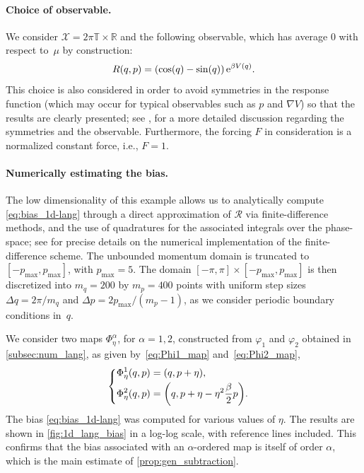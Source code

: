 \documentclass[11pt]{article}
\newcommand{\T}{\mathbb{T}}
\newcommand{\R}{\mathbb{R}}
\newcommand{\e}{\mathrm{e}}
\DeclarePairedDelimiter\paren{\lparen}{\rparen}
\theoremstyle{definition}
\let\oldparagraph=\paragraph
\renewcommand\paragraph[1]{\oldparagraph{#1.}}
\begin{document}
\paragraph{Choice of observable} We consider $\mathcal{X} = 2\pi \T \times \R$ and the following observable, which has average 0 with respect to~$\mu$ by construction: 
\begin{equation}
	R(q,p) = \paren*{\cos(q) - \sin(q)} \, \e^{\beta V(q)}.
	\label{eq:R_observable}
\end{equation}
This choice is also considered in order to avoid symmetries in the response function (which may occur for typical observables such as $p$ and $\nabla V$) so that the results are clearly presented; see \cite[Section~4.2]{spacek2023}, for a more detailed discussion regarding the symmetries and the observable. Furthermore, the forcing $F$ in consideration is a normalized constant force, i.e., $F = 1$.

\paragraph{Numerically estimating the bias} The low dimensionality of this example allows us to analytically compute \eqref{eq:bias_1d-lang} through a direct approximation of $\mathcal{R}$ via finite-difference methods, and the use of quadratures for the associated integrals over the phase-space; see \cite[Appendix B]{spacek2023} for precise details on the numerical implementation of the finite-difference scheme. The unbounded momentum domain is truncated to $[-p_\mathrm{max},p_\mathrm{max}]$, with $p_\mathrm{max} = 5$. The domain $[-\pi,\pi] \times [-p_\mathrm{max},p_\mathrm{max}]$ is then discretized into $m_q = 200$ by $m_p = 400$ points with uniform step sizes $\Delta q = 2\pi/m_q$ and $\Delta p = 2p_\mathrm{max}/(m_p-1)$, as we consider periodic boundary conditions in~$q$.

We consider two maps $\Phi_\eta^\alpha$, for $\alpha=1,2$, constructed from $\varphi_1$ and $\varphi_2$ obtained in \cref{subsec:num_lang}, as given by~\eqref{eq:Phi1_map} and~\eqref{eq:Phi2_map},
\begin{equation}
\begin{cases}
\begin{aligned}
	&\Phi_\eta^1(q,p) = (q, p + \eta), \\
	&\Phi_\eta^2(q,p) = \paren[\bigg]{q, p + \eta - \eta^2\frac{\beta}{2}p}.
\end{aligned}
\end{cases}
\end{equation}
The bias \eqref{eq:bias_1d-lang} was computed for various values of $\eta$. The results are shown in \cref{fig:1d_lang_bias} in a log-log scale, with reference lines included. This confirms that the bias associated with an $\alpha$-ordered map is itself of order $\alpha$, which is the main estimate of \cref{prop:gen_subtraction}.
\end{document}
